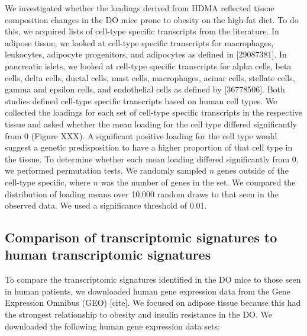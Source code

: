 \documentclass[
]{article}
\begin{document}
We investigated whether the loadings derived from HDMA reflected tissue
composition changes in the DO mice prone to obesity on the high-fat
diet. To do this, we acquired lists of cell-type specific transcripts
from the literature. In adipose tissue, we looked at cell-type specific
transcripts for macrophages, leukocytes, adipocyte progenitors, and
adipocytes as defined in {[}29087381{]}. In pancreatic islets, we looked
at cell-type specific transcripts for alpha cells, beta cells, delta
cells, ductal cells, mast cells, macrophages, acinar cells, stellate
cells, gamma and epsilon cells, and endothelial cells as defined by
{[}36778506{]}. Both studies defined cell-type specific transcripts
based on human cell types. We collected the loadings for each set of
cell-type specific transcripts in the respective tissue and asked
whether the mean loading for the cell type differed significantly from 0
(Figure XXX). A significant positive loading for the cell type would
suggest a genetic predisposition to have a higher proportion of that
cell type in the tissue. To determine whether each mean loading differed
significantly from 0, we performed permutation tests. We randomly
sampled \(n\) genes outside of the cell-type specific, where \(n\) was
the number of genes in the set. We compared the distribution of loading
means over 10,000 random draws to that seen in the observed data. We
used a significance threshold of 0.01.

\subsection{Comparison of transcriptomic signatures to human
transcriptomic
signatures}\label{comparison-of-transcriptomic-signatures-to-human-transcriptomic-signatures}

To compare the transcriptomic signatures identified in the DO mice to
those seen in human patients, we downloaded human gene expression data
from the Gene Expression Omnibus (GEO) {[}cite{]}. We focused on adipose
tissue because this had the strongest relationship to obesity and
insulin resistance in the DO. We downloaded the following human gene
expression data sets:
\end{document}
